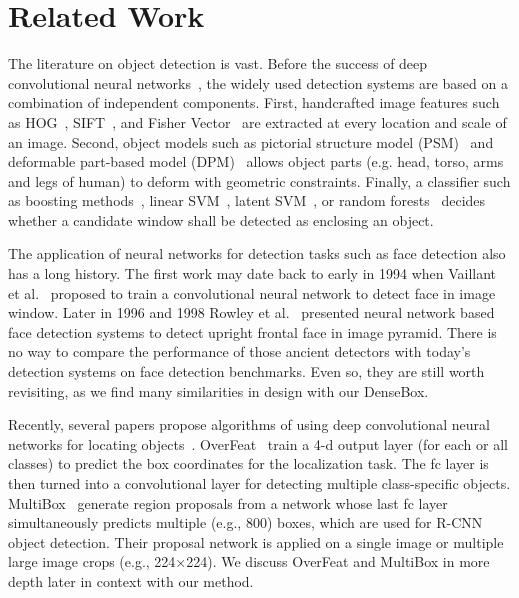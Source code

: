 \section{Related Work}

The literature on object detection is vast. Before the success of deep convolutional neural networks~\cite{krizhevsky2012imagenet}, the widely used detection systems are based on a combination of independent components. First, handcrafted image features such as HOG~\cite{dalal2005histograms}, SIFT~\cite{lowe2004distinctive}, and Fisher Vector~\cite{cinbis2013segmentation} are extracted at every location and scale of an image. Second, object models such as pictorial structure model (PSM)~\cite{felzenszwalb2005pictorial} and deformable part-based model (DPM)~\cite{felzenszwalb2010object, zhu2012face, yang2013articulated} allows object parts (e.g. head, torso, arms and legs of human) to deform with geometric constraints. Finally, a classifier such as boosting methods~\cite{viola2004robust}, linear SVM~\cite{dalal2005histograms}, latent SVM~\cite{felzenszwalb2010object}, or random forests~\cite{dollar2012crosstalk} decides whether a candidate window shall be detected as enclosing an object.  

The application of neural networks for detection tasks such as face detection also has a long history. The first work may date back to early in 1994 when Vaillant et al.~\cite{vaillant1994original} proposed to train a convolutional neural network to detect face in image window. Later in 1996 and 1998 Rowley et al.~\cite{rowley1998neural,rowley1998rotation} presented neural network based face detection systems to detect upright frontal face in image pyramid. There is no way to compare the performance of those ancient detectors with today’s detection systems on face detection benchmarks. Even so, they are still worth revisiting, as we find many similarities in design with our DenseBox. 

Recently, several papers propose algorithms of using deep convolutional neural networks for locating objects~\cite{sermanet2013overfeat, erhan2014scalable, YOLO}. OverFeat~\cite{sermanet2013overfeat} train a 4-d output layer (for each or all classes) to predict the box coordinates for the localization task. The fc layer is then turned into a convolutional layer for detecting multiple class-specific objects. MultiBox~\cite{erhan2014scalable} generate region proposals from a network whose last fc layer simultaneously predicts multiple (e.g., 800) boxes, which are used for R-CNN~\cite{girshick2014rich} object detection. Their proposal network is applied on a single image or multiple large image crops (e.g., 224×224). We discuss OverFeat and MultiBox in more depth later in context with our method.

